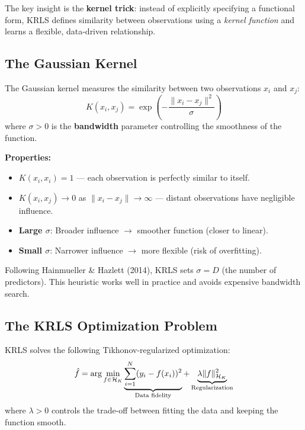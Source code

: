 The key insight is the \textbf{kernel trick}: instead of explicitly specifying a functional form, KRLS defines similarity between observations using a \emph{kernel function} and learns a flexible, data-driven relationship.

\subsection{The Gaussian Kernel}

\begin{definitionbox}
The Gaussian kernel measures the similarity between two observations $x_i$ and $x_j$:
\begin{equation}
K(x_i, x_j) = \exp\!\left(-\frac{\|x_i - x_j\|^2}{\sigma}\right)
\label{eq:kernel}
\end{equation}
where $\sigma > 0$ is the \textbf{bandwidth} parameter controlling the smoothness of the function.
\end{definitionbox}

\textbf{Properties:}
\begin{itemize}[leftmargin=2em]
\item $K(x_i, x_i) = 1$ --- each observation is perfectly similar to itself.
\item $K(x_i, x_j) \to 0$ as $\|x_i - x_j\| \to \infty$ --- distant observations have negligible influence.
\item \textbf{Large $\sigma$}: Broader influence $\to$ smoother function (closer to linear).
\item \textbf{Small $\sigma$}: Narrower influence $\to$ more flexible (risk of overfitting).
\end{itemize}

\begin{tipbox}
Following Hainmueller \& Hazlett (2014), KRLS sets $\sigma = D$ (the number of predictors). This heuristic works well in practice and avoids expensive bandwidth search.
\end{tipbox}

\subsection{The KRLS Optimization Problem}

\begin{theorembox}
KRLS solves the following Tikhonov-regularized optimization:
\begin{equation}
\hat{f} = \arg\min_{f \in \mathcal{H}_K} \underbrace{\sum_{i=1}^{N} (y_i - f(x_i))^2}_{\text{Data fidelity}} + \underbrace{\lambda \|f\|_{\mathcal{H}_K}^2}_{\text{Regularization}}
\label{eq:krls_obj}
\end{equation}
where $\lambda > 0$ controls the trade-off between fitting the data and keeping the function smooth.
\end{theorembox}

